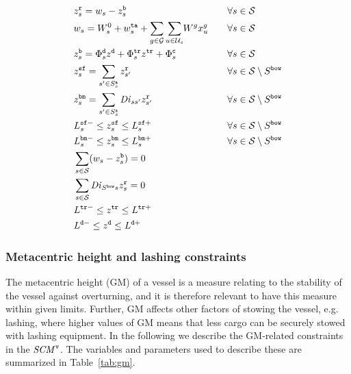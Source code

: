 \begin{alignat}{3}    
& z^{\ttt{r}}_{s} = w_{s} - z^{\ttt{b}}_{s}									&& \forall s\in\mc{S} \label{defResF} \\
& w_{s} = W^{0}_{s} + w^{\ttt{ta}}_{s} + \sum_{g\in \mc{G}} \so[r]{\sum_{u\in \mc{U}_s}}W^g x^{g}_{u} \quad
																			&& \forall s\in\mc{S} \label{defW} \\
& z^{\ttt{b}}_{s} 	= \Phi^{\ttt{d}}_{s} z^\ttt{d} + \Phi^{\ttt{tr}}_{s} z^\ttt{tr} + \Phi^{\ttt{c}}_{s} 	
																			&& \forall s\in\mc{S} \label{defBancy} \\
%                                                                             
& z^{\ttt{sf}}_{s} 	= \sum_{s'\in S^\ttt{a}_s} z^{\ttt{r}}_{s'}				&& \forall s\in\mc{S}\setminus S^\ttt{bow} \label{defShear} \\
& z^\ttt{bm}_s 		= \sum_{s'\in S^\ttt{a}_s} \mi{Di}_{ss'} z^\ttt{r}_{s'}	&& \forall s\in\mc{S}\setminus S^\ttt{bow} \label{defBending} \\
& L^{\ttt{sf}-}_{s} \leq z^{\ttt{sf}}_{s} \leq L^{\ttt{sf}+}_{s}			&& \forall s\in\mc{S}\setminus S^\ttt{bow} \label{limitsShear} \\    
& L^{\ttt{bm}-}_{s} \leq z^{\ttt{bm}}_{s} \leq L^{\ttt{bm}+}_{s}  			&& \forall s\in\mc{S}\setminus S^\ttt{bow} \label{limitsBending}\\
& \sum_{s\in\mc{S}} (w_{s}-z^\ttt{b}_s)  = 0								&& \label{noShearAtEnds} \\
& \sum_{s\in\mc{S}} \mi{Di}_{S^\ttt{bow}s} z^{\ttt{r}}_{s} = 0				&& \label{noMomentAtStern}\\
& L^{\ttt{tr}-}  	\leq z^\ttt{tr}    		\leq L^{\ttt{tr}+}				&& \label{trimLimits} \\
& L^{\ttt{d}-}	   	\leq z^\ttt{d}     		\leq L^{\ttt{d}+}				&& \label{draftLimits}
\end{alignat}

\subsubsection{Metacentric height and lashing constraints}
The metacentric height (GM) of a vessel is a measure relating to the stability of the vessel against overturning, and it is therefore relevant to have this measure within given limits. Further, GM affects other factors of stowing the vessel, e.g. lashing, where {higher} values of GM means that less cargo can be securely stowed with lashing equipment. In the following we describe the GM-related constraints in the $\mathit{SCM}^\texttt{v}$. The variables and parameters used to describe these are summarized in Table~\ref{tab:gm}.

